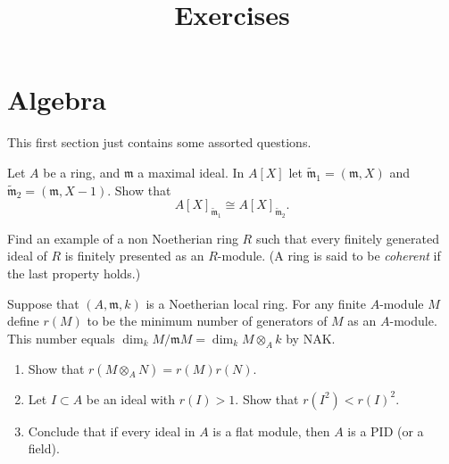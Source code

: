 

%


\title{Exercises}


\maketitle

\label{section-phantom}

\tableofcontents


\section{Algebra}
\label{section-algebra}

\noindent
This first section just contains some assorted questions.

\begin{exercise}
\label{exercise-isomorphism-localizations}
Let $A$ be a ring, and ${\mathfrak m}$ a maximal ideal. In $A[X]$
let $\tilde {\mathfrak m}_1 = ({\mathfrak m}, X)$ and
$\tilde {\mathfrak m}_2 = ({\mathfrak m}, X-1)$. Show
that
$$
A[X]_{\tilde {\mathfrak m}_1} \cong A[X]_{\tilde {\mathfrak m}_2}.
$$
\end{exercise}

\begin{exercise}
\label{exercise-coherent}
Find an example of a non Noetherian ring $R$ such that every
finitely generated ideal of $R$ is finitely presented as an $R$-module.
(A ring is said to be {\it coherent} if the last property holds.)
\end{exercise}

\begin{exercise}
\label{exercise-flat-ideals-pid}
Suppose that $(A, {\mathfrak m}, k)$ is a Noetherian local ring. For any
finite $A$-module $M$ define $r(M)$ to be the minimum number
of generators of $M$ as an $A$-module. This number equals
$\dim_k M/{\mathfrak m} M = \dim_k M \otimes_A k$ by NAK.
\begin{enumerate}
\item Show that $r(M \otimes_A N) = r(M)r(N)$.
\item Let $I\subset A $ be an ideal with $r(I) > 1$. Show that
$r(I^2) < r(I)^2$.
\item Conclude that if every ideal in $A$ is a flat module, then
$A$ is a PID (or a field).
\end{enumerate}
\end{exercise}

